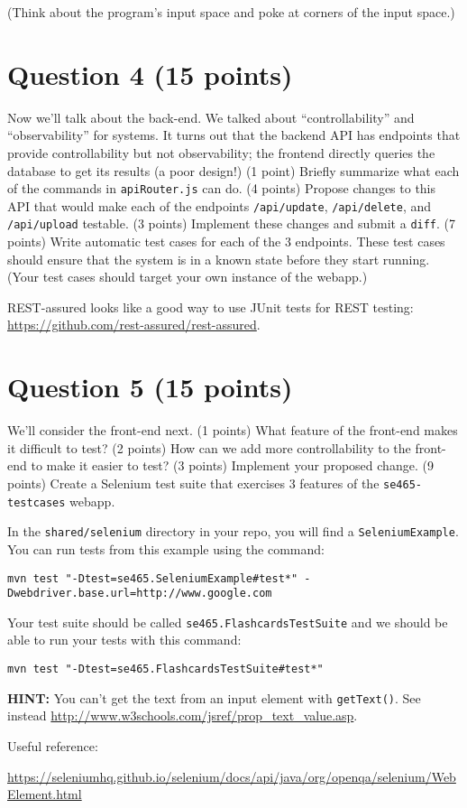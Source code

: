 \documentclass[10pt,hidelinks]{article}
\begin{document}
(Think about the program's input space and poke at corners of the
input space.)

\section*{Question 4 (15 points)}
Now we'll talk about the back-end. We talked about ``controllability''
and ``observability'' for systems.  It turns out that the backend API
has endpoints that provide controllability but not observability; the
frontend directly queries the database to get its results (a poor
design!)  (1 point) Briefly summarize what each of the commands in
{\tt apiRouter.js} can do. (4 points) Propose changes to this API that
would make each of the endpoints {\tt /api/update}, {\tt /api/delete},
and {\tt /api/upload} testable. (3 points) Implement these changes and
submit a {\tt diff}.
(7 points) Write automatic test cases for each of the 3 endpoints.
These test cases should ensure that the system is in a known state
before they start running. (Your test cases should target your own instance
of the webapp.)

REST-assured looks like a good way to use JUnit tests for REST
testing: \url{https://github.com/rest-assured/rest-assured}.

\section*{Question 5 (15 points)}
We'll consider the front-end next. (1 points) What feature of the front-end
makes it difficult to test? (2 points) How can we add more controllability
to the front-end to make it easier to test? (3 points) Implement your proposed
change. (9 points) Create a Selenium test suite that exercises 3 features of the
{\tt se465-testcases} webapp.

In the {\tt shared/selenium} directory in your repo, you will find a {\tt SeleniumExample}.
You can run tests from this example using the command:

\begin{verbatim}
mvn test "-Dtest=se465.SeleniumExample#test*" -Dwebdriver.base.url=http://www.google.com
\end{verbatim}

Your test suite should be called {\tt se465.FlashcardsTestSuite} and we should be able to run your tests with this command:

\begin{verbatim}
mvn test "-Dtest=se465.FlashcardsTestSuite#test*"
\end{verbatim}

{\bf HINT:} You can't get the text from an input element with {\tt getText()}. See instead
\url{http://www.w3schools.com/jsref/prop_text_value.asp}.

Useful reference:

\url{https://seleniumhq.github.io/selenium/docs/api/java/org/openqa/selenium/WebElement.html}
\end{document}
